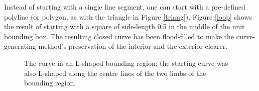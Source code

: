 \documentclass[12pt]{article}
\begin{document}
Instead of starting with a single line segment, one can start with a
pre-defined polyline (or polygon, as with the triangle in Figure \ref{triang}).  Figure
\ref{loop} shows the result of starting with a square of side-length
0.5 in the middle of the unit bounding box.  The resulting closed
curve has been flood-filled to make the curve-generating-method's
preservation of the interior and the exterior clearer.

\begin{figure}[h!]
 \begin{center} 
  \parbox{110mm}{\caption{\label{bnd} The curve in an L-shaped bounding region; the
  starting curve was also L-shaped along the centre lines of the two
  limbs of the bounding region.}}
\end{center}
\end{figure}
\end{document}
